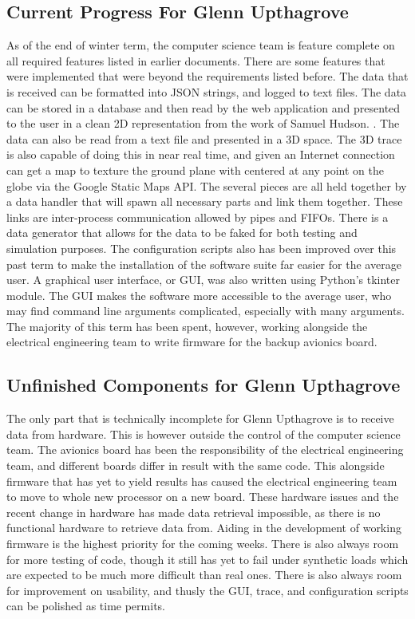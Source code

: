 \documentclass[onecolumn, draftclsnofoot,10pt, compsoc]{IEEEtran}
\begin{document}
\subsection {Current Progress For Glenn Upthagrove} 
As of the end of winter term, the computer science team is feature complete on all required features listed in earlier documents. There are some features that were implemented that were beyond the requirements listed before. The data that is received can be formatted into JSON strings, and logged to text files. The data can be stored in a database and then read by the web application and presented to the user in a clean 2D representation from the work of Samuel Hudson. . The data can also be read from a text file and presented in a 3D space. The 3D trace is also capable of doing this in near real time, and given an Internet connection can get a map to texture the ground plane with centered at any point on the globe via the Google Static Maps API. The several pieces are all held together by a data handler that will spawn all necessary parts and link them together. These links are inter-process communication allowed by pipes and FIFOs. There is a data generator that allows for the data to be faked for both testing and simulation purposes. The configuration scripts also has been improved over this past term to make the installation of the software suite far easier for the average user. A graphical user interface, or GUI, was also written using Python’s tkinter module. The GUI makes the software more accessible to the average user, who may find command line arguments complicated, especially with many arguments. The majority of this term has been spent, however, working alongside the electrical engineering team to write firmware for the backup avionics board. 
\subsection {Unfinished Components for Glenn Upthagrove}
The only part that is technically incomplete for Glenn Upthagrove is to receive data from hardware. This is however outside the control of the computer science team. The avionics board has been the responsibility of the electrical engineering team, and different boards differ in result with the same code. This alongside firmware that has yet to yield results has caused the electrical engineering team to move to whole new processor on a new board. These hardware issues and the recent change in hardware has made data retrieval impossible, as there is no functional hardware to retrieve data from. Aiding in the development of working firmware is the highest priority for the coming weeks. There is also always room for more testing of code, though it still has yet to fail under synthetic loads which are expected to be much more difficult than real ones. There is also always room for improvement on usability, and thusly the GUI, trace, and configuration scripts can be polished as time permits. 
\end{document}
